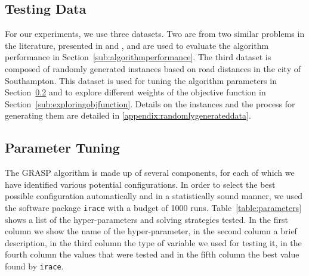 \documentclass[a4paper,11pt,authoryear]{elsarticle}
\begin{document}
\subsection{Testing Data}
\label{sub:testing}
\noindent For our experiments, we use three datasets. Two are from two similar problems in the literature, presented in \cite{mankowska2014} and \cite{aithaddadene2016}, and are used to evaluate the algorithm performance in Section~\ref{sub:algorithmperformance}. The third dataset is composed of randomly generated instances based on road distances in the city of Southampton. This dataset is used for tuning the algorithm parameters in Section~\ref{sub:parametertuning} and to explore different weights of the objective function in Section~\ref{sub:exploringobjfunction}. Details on the instances and the process for generating them are detailed in \ref{appendix:randomlygenerateddata}.

\subsection{Parameter Tuning}
\label{sub:parametertuning}
\noindent The GRASP algorithm is made up of several components, for each of which we have identified various potential configurations. %
In order to select the best possible configuration automatically and in a statistically sound manner, we used the software package \texttt{irace} \citep{lopez2016} with a budget of 1000 runs. Table~\ref{table:parameters} shows a list of the hyper-parameters and solving strategies tested. In the first column we show the name of the hyper-parameter, in the second column a brief description, in the third column the type of variable we used for testing it, in the fourth column the values that were tested and in the fifth column the best value found by \texttt{irace}.
\end{document}
